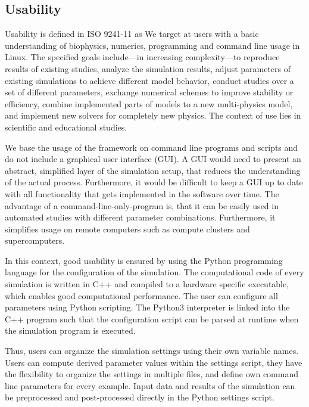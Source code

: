 \subsection{Usability}
Usability is defined in ISO 9241-11 \cite{ISO9241} as   
We target at users with a basic understanding of biophysics, numerics, programming and command line usage in Linux. 
The specified goals include---in increasing complexity---to reproduce results of existing studies,  analyze the simulation results,  adjust parameters of existing simulations to achieve different model behavior, conduct studies over a set of different parameters,  exchange numerical schemes to improve stability or efficiency, combine implemented parts of models to a new multi-physics model, and implement new solvers for completely new physics. The context of use lies in scientific and educational studies. 

We base the usage of the framework on command line programs and scripts and do not include a graphical user interface (GUI). A GUI would need to present an abstract, simplified layer of the simulation setup, that reduces the understanding of the actual process. Furthermore, it would be difficult to keep a GUI up to date with all functionality that gets implemented in the software over time. The advantage of a command-line-only-program is, that it can be easily used in automated studies with different parameter combinations. Furthermore, it simplifies usage on remote computers such as compute clusters and supercomputers.

In this context, good usability is ensured by using the Python programming language for the configuration of the simulation.
The computational code of every simulation is written in C++ and compiled to a hardware specific executable, which enables good computational performance. The user can configure all parameters using Python scripting. The Python3 interpreter is linked into the C++ program such that the configuration script can be parsed at runtime when the simulation program is executed.

Thus, users can organize the simulation settings using their own variable names.
Users can compute derived parameter values within the settings script, they have the flexibility to organize the settings in multiple files, and define own command line parameters for every example. Input data and results of the simulation can be preprocessed and post-processed directly in the Python settings script.

